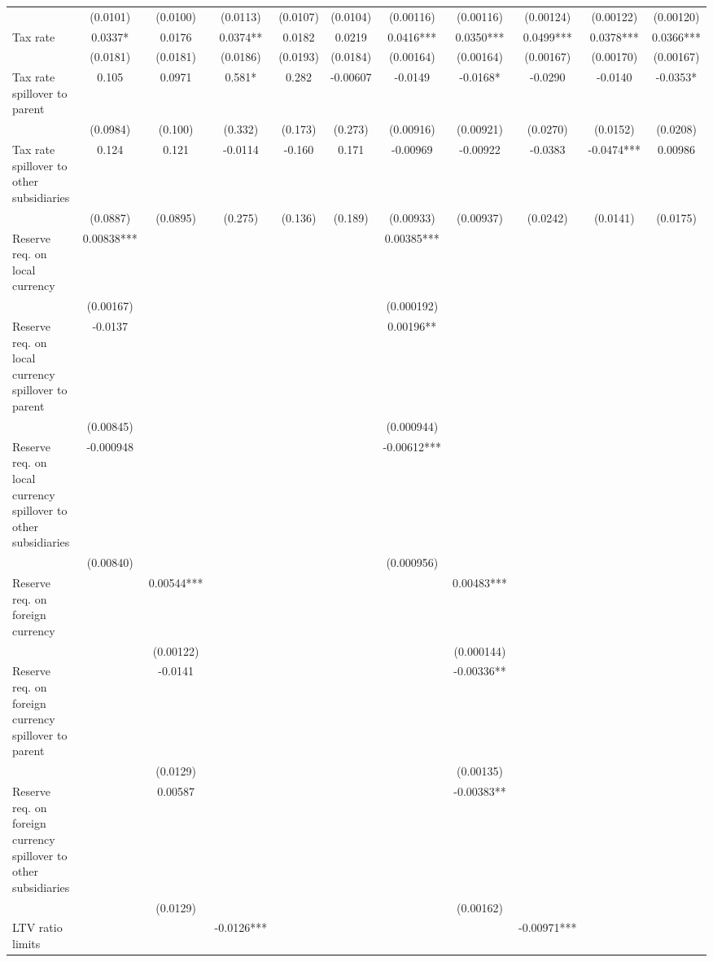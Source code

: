 \begin{tabular}{lcccccccccc}
 & (0.0101) & (0.0100) & (0.0113) & (0.0107) & (0.0104) & (0.00116) & (0.00116) & (0.00124) & (0.00122) & (0.00120) \\
Tax rate & 0.0337* & 0.0176 & 0.0374** & 0.0182 & 0.0219 & 0.0416*** & 0.0350*** & 0.0499*** & 0.0378*** & 0.0366*** \\
 & (0.0181) & (0.0181) & (0.0186) & (0.0193) & (0.0184) & (0.00164) & (0.00164) & (0.00167) & (0.00170) & (0.00167) \\
Tax rate spillover to parent & 0.105 & 0.0971 & 0.581* & 0.282 & -0.00607 & -0.0149 & -0.0168* & -0.0290 & -0.0140 & -0.0353* \\
 & (0.0984) & (0.100) & (0.332) & (0.173) & (0.273) & (0.00916) & (0.00921) & (0.0270) & (0.0152) & (0.0208) \\
Tax rate spillover to other subsidiaries & 0.124 & 0.121 & -0.0114 & -0.160 & 0.171 & -0.00969 & -0.00922 & -0.0383 & -0.0474*** & 0.00986 \\
 & (0.0887) & (0.0895) & (0.275) & (0.136) & (0.189) & (0.00933) & (0.00937) & (0.0242) & (0.0141) & (0.0175) \\
Reserve req. on local currency & 0.00838*** &  &  &  &  & 0.00385*** &  &  &  &  \\
 & (0.00167) &  &  &  &  & (0.000192) &  &  &  &  \\
Reserve req. on local currency spillover to parent & -0.0137 &  &  &  &  & 0.00196** &  &  &  &  \\
 & (0.00845) &  &  &  &  & (0.000944) &  &  &  &  \\
Reserve req. on local currency spillover to other subsidiaries & -0.000948 &  &  &  &  & -0.00612*** &  &  &  &  \\
 & (0.00840) &  &  &  &  & (0.000956) &  &  &  &  \\
Reserve req. on foreign currency &  & 0.00544*** &  &  &  &  & 0.00483*** &  &  &  \\
 &  & (0.00122) &  &  &  &  & (0.000144) &  &  &  \\
Reserve req. on foreign currency spillover to parent &  & -0.0141 &  &  &  &  & -0.00336** &  &  &  \\
 &  & (0.0129) &  &  &  &  & (0.00135) &  &  &  \\
Reserve req. on foreign currency spillover to other subsidiaries &  & 0.00587 &  &  &  &  & -0.00383** &  &  &  \\
 &  & (0.0129) &  &  &  &  & (0.00162) &  &  &  \\
LTV ratio limits &  &  & -0.0126*** &  &  &  &  & -0.00971*** &  &  \\

\end{tabular}
